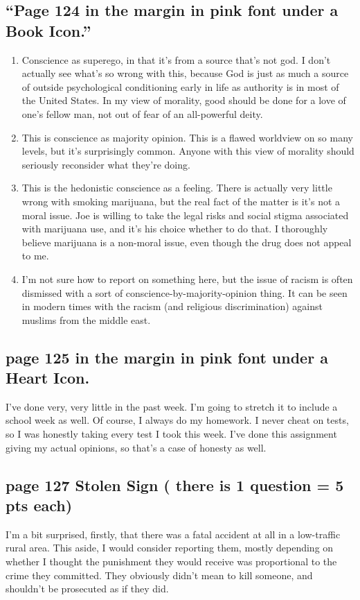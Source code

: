 \documentclass[12pt]{article}
\begin{document}
\subsection{``Page 124 in the margin in pink font under a Book Icon.''}
\begin{enumerate}
	\item Conscience as superego, in that it's from a source that's not god.  I 
		don't actually see what's so wrong with this, because God is just as much a
		source of outside psychological conditioning early in life as authority is in
		most of the United States.  In my view of morality, good should be done for
		a love of one's fellow man, not out of fear of an all-powerful deity.
	\item This is conscience as majority opinion.  This is a flawed worldview on
		so many levels, but it's surprisingly common.  Anyone with this view of
		morality should seriously reconsider what they're doing.
	\item This is the hedonistic conscience as a feeling.  There is actually
		very little wrong with smoking marijuana, but the real fact of the matter
		is it's not a moral issue.  Joe is willing to take the legal risks and 
		social stigma associated with marijuana use, and it's his choice whether
		to do that.  I thoroughly believe marijuana is a non-moral issue, even though
		the drug does not appeal to me.
	\item I'm not sure how to report on something here, but the issue of racism is
		often dismissed with a sort of conscience-by-majority-opinion thing.  It
		can be seen in modern times with the racism (and religious discrimination)
		against muslims from the middle east.  
\end{enumerate}

\subsection{page 125 in the margin in pink font under a Heart Icon.}
	I've done very, very little in the past week.  I'm going to stretch it
	to include a school week as well.  Of course, I always do my homework.  I 
	never cheat on tests, so I was honestly taking every test I took this week.  
	I've done this assignment giving my actual opinions, so that's a case of honesty
	as well.

\subsection{page 127 Stolen Sign ( there is 1 question = 5 pts each)}
	I'm a bit surprised, firstly, that there was a fatal accident at all in a 
	low-traffic rural area.  This aside, I would consider reporting them,
	mostly depending on whether I thought the punishment they would receive
	was proportional to the crime they committed.  They obviously didn't mean to
	kill someone, and shouldn't be prosecuted as if they did.
\end{document}
